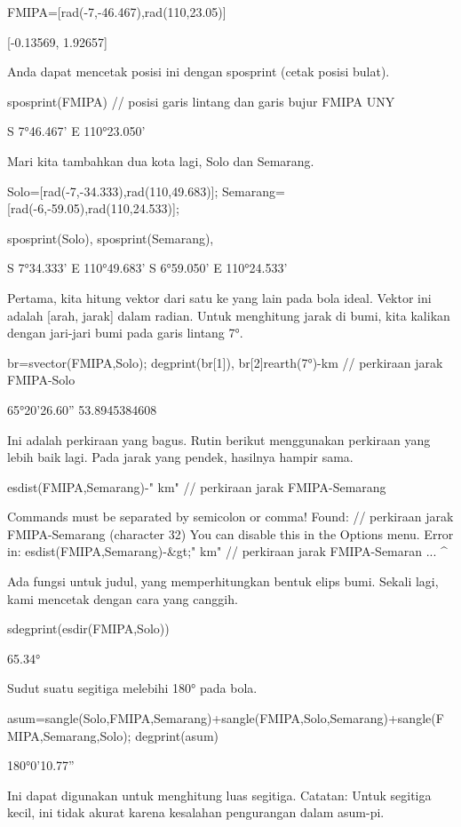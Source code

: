 \documentclass{article}
\begin{document}
\>FMIPA=[rad(-7,-46.467),rad(110,23.05)]


    [-0.13569,  1.92657]

Anda dapat mencetak posisi ini dengan sposprint (cetak posisi bulat).


\>sposprint(FMIPA) // posisi garis lintang dan garis bujur FMIPA UNY


    S 7°46.467' E 110°23.050'

Mari kita tambahkan dua kota lagi, Solo dan Semarang.


\>Solo=[rad(-7,-34.333),rad(110,49.683)]; Semarang=[rad(-6,-59.05),rad(110,24.533)];

\>sposprint(Solo), sposprint(Semarang),


    S 7°34.333' E 110°49.683'
    S 6°59.050' E 110°24.533'

Pertama, kita hitung vektor dari satu ke yang lain pada bola ideal.
Vektor ini adalah [arah, jarak] dalam radian. Untuk menghitung jarak
di bumi, kita kalikan dengan jari-jari bumi pada garis lintang 7°.


\>br=svector(FMIPA,Solo); degprint(br[1]), br[2]\*rearth(7°)-\>km // perkiraan jarak FMIPA-Solo


    65°20'26.60''
    53.8945384608

Ini adalah perkiraan yang bagus. Rutin berikut menggunakan perkiraan
yang lebih baik lagi. Pada jarak yang pendek, hasilnya hampir sama.


\>esdist(FMIPA,Semarang)-\>" km" // perkiraan jarak FMIPA-Semarang


    Commands must be separated by semicolon or comma!
    Found:  // perkiraan jarak FMIPA-Semarang (character 32)
    You can disable this in the Options menu.
    Error in:
    esdist(FMIPA,Semarang)-&gt;" km" // perkiraan jarak FMIPA-Semaran ...
                                 ^

Ada fungsi untuk judul, yang memperhitungkan bentuk elips bumi. Sekali
lagi, kami mencetak dengan cara yang canggih.


\>sdegprint(esdir(FMIPA,Solo))


         65.34°

Sudut suatu segitiga melebihi 180° pada bola.


\>asum=sangle(Solo,FMIPA,Semarang)+sangle(FMIPA,Solo,Semarang)+sangle(FMIPA,Semarang,Solo); degprint(asum)


    180°0'10.77''

Ini dapat digunakan untuk menghitung luas segitiga. Catatan: Untuk
segitiga kecil, ini tidak akurat karena kesalahan pengurangan dalam
asum-pi.
\end{document}

